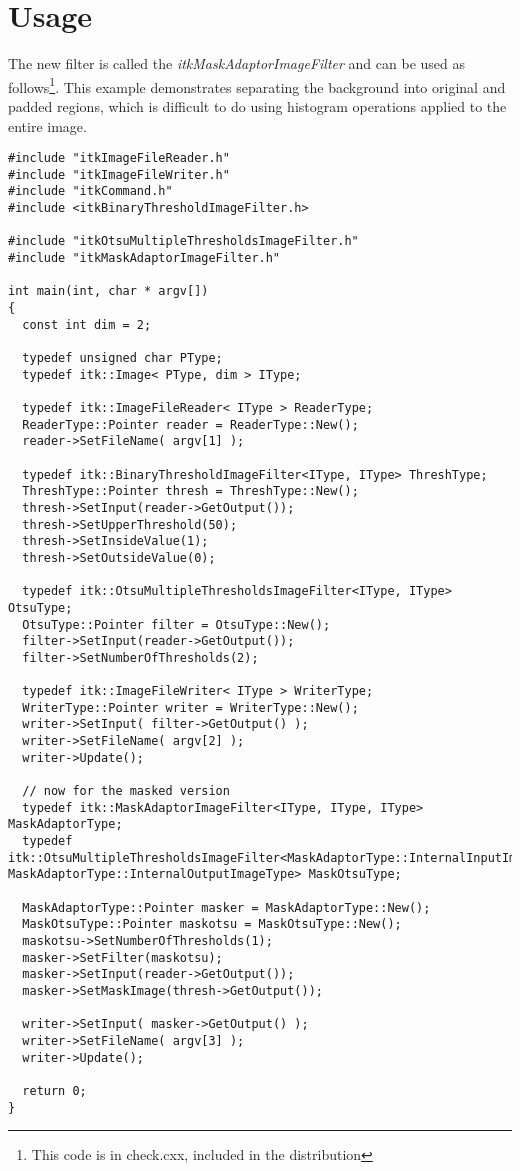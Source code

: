 \documentclass{InsightArticle}
\begin{document}
\section{Usage}
The new filter is called the {\em itkMaskAdaptorImageFilter} and can
be used as follows\footnote{This code is in check.cxx, included in the
distribution}. This example demonstrates separating the background
into original and padded regions, which is difficult to do using
histogram operations applied to the entire image.
\small \begin{verbatim}
#include "itkImageFileReader.h"
#include "itkImageFileWriter.h"
#include "itkCommand.h"
#include <itkBinaryThresholdImageFilter.h>

#include "itkOtsuMultipleThresholdsImageFilter.h"
#include "itkMaskAdaptorImageFilter.h"

int main(int, char * argv[])
{
  const int dim = 2;

  typedef unsigned char PType;
  typedef itk::Image< PType, dim > IType;

  typedef itk::ImageFileReader< IType > ReaderType;
  ReaderType::Pointer reader = ReaderType::New();
  reader->SetFileName( argv[1] );

  typedef itk::BinaryThresholdImageFilter<IType, IType> ThreshType;
  ThreshType::Pointer thresh = ThreshType::New();
  thresh->SetInput(reader->GetOutput());
  thresh->SetUpperThreshold(50);
  thresh->SetInsideValue(1);
  thresh->SetOutsideValue(0);

  typedef itk::OtsuMultipleThresholdsImageFilter<IType, IType> OtsuType;
  OtsuType::Pointer filter = OtsuType::New();
  filter->SetInput(reader->GetOutput());
  filter->SetNumberOfThresholds(2);

  typedef itk::ImageFileWriter< IType > WriterType;
  WriterType::Pointer writer = WriterType::New();
  writer->SetInput( filter->GetOutput() );
  writer->SetFileName( argv[2] );
  writer->Update();

  // now for the masked version
  typedef itk::MaskAdaptorImageFilter<IType, IType, IType> MaskAdaptorType;
  typedef itk::OtsuMultipleThresholdsImageFilter<MaskAdaptorType::InternalInputImageType, MaskAdaptorType::InternalOutputImageType> MaskOtsuType;

  MaskAdaptorType::Pointer masker = MaskAdaptorType::New();
  MaskOtsuType::Pointer maskotsu = MaskOtsuType::New();
  maskotsu->SetNumberOfThresholds(1);
  masker->SetFilter(maskotsu);
  masker->SetInput(reader->GetOutput());
  masker->SetMaskImage(thresh->GetOutput());

  writer->SetInput( masker->GetOutput() );
  writer->SetFileName( argv[3] );
  writer->Update();

  return 0;
}
\end{verbatim} \normalsize
\end{document}
